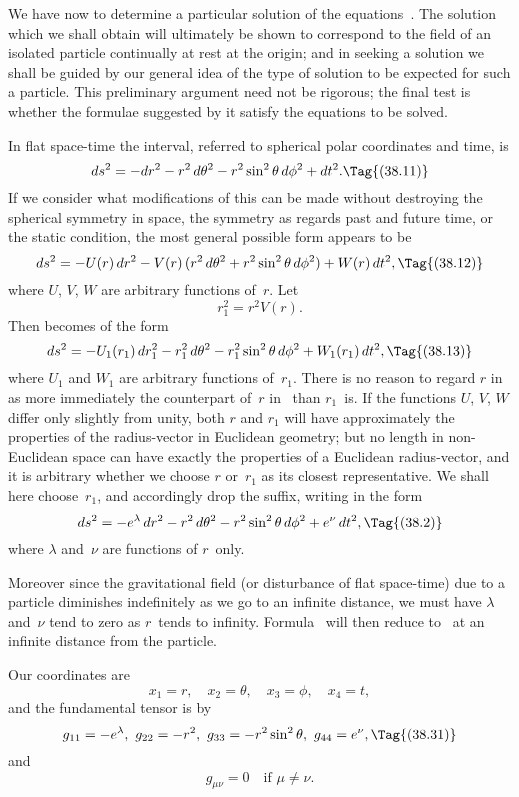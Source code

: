 \documentclass[12pt]{book}
\begin{document}
We have now to determine a particular solution of the equations~.
The solution which we shall obtain will ultimately be shown to correspond to
the field of an isolated particle continually at rest at the origin; and in seeking
a solution we shall be guided by our general idea of the type of solution to be
expected for such a particle. This preliminary argument need not be rigorous;
the final test is whether the formulae suggested by it satisfy the equations
to be solved.

In flat space-time the interval, referred to spherical polar coordinates and
time, is
\[
ds^{2} = -dr^{2} - r^{2}\, d\theta^{2} - r^{2} \sin^{2}\theta\, d\phi^{2} + dt^{2}.
\Tag{(38.11)}
\]
If we consider what modifications of this can be made without destroying the
spherical symmetry in space, the symmetry as regards past and future time,
or the static condition, the most general possible form appears to be
\[
ds^{2} = -U(r)\, dr^{2} - V(r)\, (r^{2}\, d\theta^{2} + r^{2} \sin^{2}\theta\, d\phi^{2}) + W(r)\, dt^{2},
\Tag{(38.12)}
\]
where $U$, $V$, $W$ are arbitrary functions of~$r$. Let
\[
r_{1}^{2} = r^{2} V(r).
\]
Then  becomes of the form
\[
ds^{2} = - U_{1}(r_{1})\, dr_{1}^{2} - r_{1}^{2}\, d\theta^{2} - r_{1}^{2} \sin^{2}\theta\, d\phi^{2} + W_{1}(r_{1})\, dt^{2},
\Tag{(38.13)}
\]
where $U_{1}$ and $W_{1}$ are arbitrary functions of~$r_{1}$. There is no reason to regard
$r$ in~ as more immediately the counterpart of~$r$ in~ than $r_{1}$~is. If
the functions $U$, $V$, $W$ differ only slightly from unity, both $r$ and $r_{1}$ will have
approximately the properties of the radius-vector in Euclidean geometry; but
no length in non-Euclidean space can have exactly the properties of a Euclidean
radius-vector, and it is arbitrary whether we choose $r$ or~$r_{1}$ as its closest representative.
We shall here choose~$r_{1}$, and accordingly drop the suffix, writing
 in the form
\[
ds^{2} = -e^{\lambda}\, dr^{2} - r^{2}\, d\theta^{2} - r^{2} \sin^{2}\theta\, d\phi^{2} + e^{\nu}\, dt^{2},
\Tag{(38.2)}
\]
where $\lambda$ and~$\nu$ are functions of $r$~only.

Moreover since the gravitational field (or disturbance of flat space-time)
due to a particle diminishes indefinitely as we go to an infinite distance, we
must have $\lambda$ and~$\nu$ tend to zero as $r$~tends to infinity. Formula~ will
then reduce to~ at an infinite distance from the particle.

Our coordinates are
\[
x_{1} = r,\quad
x_{2} = \theta,\quad
x_{3} = \phi,\quad
x_{4} = t,
\]
and the fundamental tensor is by~
\[
g_{11} = -e^{\lambda},\
g_{22} = -r^{2},\
g_{33} = -r^{2} \sin^{2}\theta,\
g_{44} = e^{\nu},
\Tag{(38.31)}
\]
and
\[
g_{\mu\nu} = 0\quad\text{if $\mu \neq \nu$.}
\]
\end{document}
